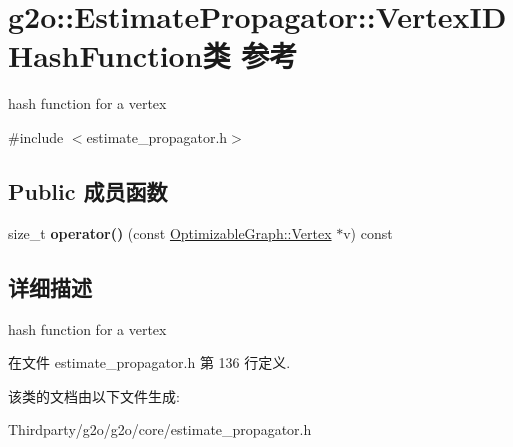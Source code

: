 \hypertarget{classg2o_1_1EstimatePropagator_1_1VertexIDHashFunction}{\section{g2o\-:\-:Estimate\-Propagator\-:\-:Vertex\-I\-D\-Hash\-Function类 参考}
\label{classg2o_1_1EstimatePropagator_1_1VertexIDHashFunction}
}


hash function for a vertex  




{\ttfamily \#include $<$estimate\-\_\-propagator.\-h$>$}

\subsection*{Public 成员函数}
\begin{DoxyCompactItemize}
\item 
\hypertarget{classg2o_1_1EstimatePropagator_1_1VertexIDHashFunction_a91bce7799a0009af5a52fbe4fa97ef9c}{size\-\_\-t {\bfseries operator()} (const \hyperlink{classg2o_1_1OptimizableGraph_1_1Vertex}{Optimizable\-Graph\-::\-Vertex} $\ast$v) const }\label{classg2o_1_1EstimatePropagator_1_1VertexIDHashFunction_a91bce7799a0009af5a52fbe4fa97ef9c}

\end{DoxyCompactItemize}


\subsection{详细描述}
hash function for a vertex 

在文件 estimate\-\_\-propagator.\-h 第 136 行定义.



该类的文档由以下文件生成\-:\begin{DoxyCompactItemize}
\item 
Thirdparty/g2o/g2o/core/estimate\-\_\-propagator.\-h\end{DoxyCompactItemize}
